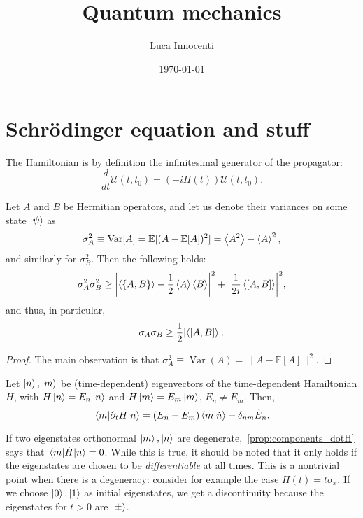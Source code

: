 \documentclass[12pt]{report}
\date{\today}
\newcommand{\EE}{\mathbb{E}}
\DeclareMathOperator{\Var}{Var}
\begin{document}
\title{Quantum mechanics}
\author{Luca Innocenti}
\maketitle

\dominitoc
\tableofcontents

\chapter{Schr\"{o}dinger equation and stuff}

\begin{prop}
	The Hamiltonian is by definition the infinitesimal generator of the propagator:
	\begin{equation}
		\frac{d}{dt}\mathcal U(t,t_0) = (-iH(t))\mathcal U(t,t_0).
	\end{equation}
\end{prop}

\begin{thm}
	Let $A$ and $B$ be Hermitian operators, and let us denote their variances on some state $\ket\psi$ as
	\[ \sigma_A^2\equiv\Var[A]=\EE[(A-\EE[A])^2] = \expval{A^2}-\expval{A}^2, \]
	and similarly for $\sigma_B^2$.
	Then the following holds:
	\begin{equation}
		\sigma_A^2 \sigma_B^2 \ge
		\abs{\expval{\{A,B\}}-\frac{1}{2}\expval A\expval B}^2
		+ \abs{\frac{1}{2i} \expval{[A,B]}}^2,
	\end{equation}
	and thus, in particular,
	\begin{equation}
		\sigma_A\sigma_B\ge\frac{1}{2}\abs{\expval{[A,B]}}.
	\end{equation}
\end{thm}
\begin{proof}
	The main observation is that $\sigma_A^2\equiv\Var(A)=\|A-\EE[A]\|^2$.
\end{proof}

\begin{prop}
	Let $\ket n,\ket m$ be (time-dependent) eigenvectors of the time-dependent Hamiltonian $H$, with
	$H\ket n=E_n\ket n$ and $H\ket m=E_m\ket m$, $E_n\neq E_m$. Then,
	\[
		\mel{m}{\partial_t H}{n}=(E_n-E_m)\braket{m}{\dot n}
		+ \delta_{nm} \dot E_n.
	\]
	\label{prop:components_dotH}
\end{prop}

\begin{remark}
	If two eigenstates orthonormal $\ket m, \ket n$ are degenerate,~\cref{prop:components_dotH} says that $\mel{m}{\dot H}{n}=0$. While this is true, it should be noted that it only holds if the eigenstates are chosen to be \emph{differentiable} at all times. This is a nontrivial point when there is a degeneracy: consider for example the case $H(t)=t\sigma_x$. If we choose $\ket0, \ket1$ as initial eigenstates, we get a discontinuity because the eigenstates for $t>0$ are $\ket\pm$.
\end{remark}
\end{document}
